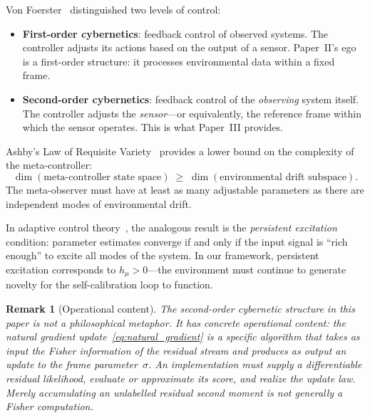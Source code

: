 \documentclass[12pt]{article}
\newtheorem{remark}[theorem]{Remark}
\begin{document}
Von Foerster~\cite{vonFoerster2003} distinguished two levels
of control:
\begin{itemize}
\item \textbf{First-order cybernetics}: feedback control of
  observed systems.
  The controller adjusts its actions based on the output of
  a sensor.
  Paper~II's ego is a first-order structure: it processes
  environmental data within a fixed frame.
\item \textbf{Second-order cybernetics}: feedback control of
  the \emph{observing} system itself.
  The controller adjusts the \emph{sensor}---or equivalently,
  the reference frame within which the sensor operates.
  This is what Paper~III provides.
\end{itemize}

Ashby's Law of Requisite Variety~\cite{Ashby1956} provides a
lower bound on the complexity of the meta-controller:
\begin{equation}
\label{eq:requisite_variety}
\dim\!\left(\text{meta-controller state space}\right)
\;\geq\; \dim\!\left(\text{environmental drift subspace}\right).
\end{equation}
The meta-observer must have at least as many adjustable
parameters as there are independent modes of environmental
drift.

In adaptive control
theory~\cite{AstromWittenmark1995}, the analogous result is
the \emph{persistent excitation} condition: parameter
estimates converge if and only if the input signal is
``rich enough'' to excite all modes of the system.
In our framework, persistent excitation corresponds to
$h_\mu > 0$---the environment must continue to generate
novelty for the self-calibration loop to function.

\begin{remark}[Operational content]
\label{rem:cybernetics_operational}
The second-order cybernetic structure in this paper is
\emph{not} a philosophical metaphor.
It has concrete operational content: the natural gradient
update~\eqref{eq:natural_gradient} is a specific algorithm
that takes as input the Fisher information of the residual
stream and produces as output an update to the frame
parameter~$\sigma$.
An implementation must supply a differentiable residual likelihood,
evaluate or approximate its score, and realize the update law.  Merely
accumulating an unlabelled residual second moment is not generally a
Fisher computation.
\end{remark}

\end{document}
